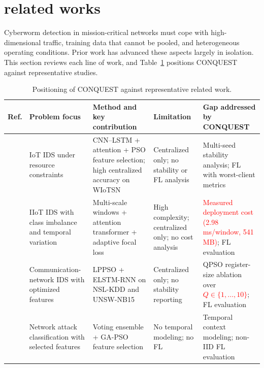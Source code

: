 \documentclass[conference]{IEEEtran}
\begin{document}
\section{\textbf{related works}}
\label{sec:related_works}

Cyberworm detection in mission-critical networks must cope with
high-dimensional traffic, training data that cannot be pooled, and
heterogeneous operating conditions. Prior work has advanced these
aspects largely in isolation. This section reviews each line of work,
and Table~\ref{tab:rw_qualitative} positions CONQUEST against
representative studies.

\begin{table}[!htbp]
\centering
\scriptsize
\caption{Positioning of CONQUEST against representative related work.}
\label{tab:rw_qualitative}
\setlength{\tabcolsep}{5pt}
\renewcommand{\arraystretch}{1.3}
\begin{tabular}{>{\raggedright\arraybackslash}p{1.0cm} >{\raggedright\arraybackslash}p{2.6cm} >{\raggedright\arraybackslash}p{4.0cm} >{\raggedright\arraybackslash}p{3.2cm} >{\raggedright\arraybackslash}p{4.4cm}}
\hline\toprule
\textbf{Ref.} & \textbf{Problem focus} & \textbf{Method and key contribution} & \textbf{Limitation} & \textbf{Gap addressed by CONQUEST} \\
\hline\toprule
\cite{phalaagaehybrid} & IoT IDS under resource constraints & CNN--LSTM + attention + PSO feature selection; high centralized accuracy on WIoTSN & Centralized only; no stability or FL analysis & Multi-seed stability analysis; FL with worst-client metrics \\

\midrule

\cite{yuadaptive} & IIoT IDS with class imbalance and temporal variation & Multi-scale windows + attention transformer + adaptive focal loss & High complexity; centralized only; no cost analysis & \textcolor{red}{Measured deployment cost (2.98\,ms/window, 541\,MB)}; FL evaluation \\

\midrule

\cite{donkoloptimization} & Communication-network IDS with optimized features & LPPSO + ELSTM-RNN on NSL-KDD and UNSW-NB15 & Centralized only; no stability reporting & QPSO register-size ablation over \textcolor{red}{$Q\in\{1,\dots,10\}$}; FL evaluation \\

\midrule

\cite{shrivashybrid} & Network attack classification with selected features & Voting ensemble + GA-PSO feature selection & No temporal modeling; no FL & Temporal context modeling; non-IID FL evaluation \\


\end{tabular}
\end{table}
\end{document}
